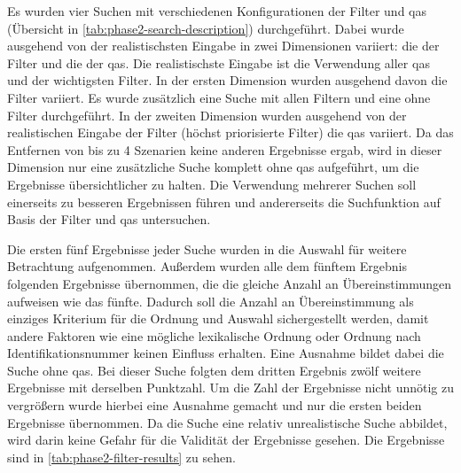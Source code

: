 Es wurden vier Suchen mit verschiedenen Konfigurationen der Filter und \glspl{qa} (Übersicht in \cref{tab:phase2-search-description}) durchgeführt.
Dabei wurde ausgehend von der realistischsten Eingabe in zwei Di\-men\-sio\-nen variiert: die der Filter und die der \glspl{qa}.
Die realistischste Eingabe ist die Verwendung aller \glspl{qa} und der wichtigsten Filter.
In der ersten Dimension wurden ausgehend davon die Filter variiert.
Es wurde zusätzlich eine Suche mit allen Filtern und eine ohne Filter durchgeführt.
In der zweiten Dimension wurden ausgehend von der realistischen Eingabe der Filter (höchst priorisierte Filter) die \glspl{qa} variiert.
Da das Entfernen von bis zu 4 Szenarien keine anderen Ergebnisse ergab, wird in dieser Dimension nur eine zusätzliche Suche komplett ohne \glspl{qa} aufgeführt, um die Ergebnisse übersichtlicher zu halten.
Die Verwendung mehrerer Suchen soll einerseits zu besseren Ergebnissen führen und andererseits die Suchfunktion auf Basis der Filter und \glspl{qa} untersuchen. 



Die ersten fünf Ergebnisse jeder Suche wurden in die Auswahl für weitere Betrachtung aufgenommen.
Außerdem wurden alle dem fünftem Ergebnis folgenden Ergebnisse übernommen, die die gleiche Anzahl an Übereinstimmungen aufweisen wie das fünfte.
Dadurch soll die Anzahl an Übereinstimmung als einziges Kriterium für die Ordnung und Auswahl sichergestellt werden, damit andere Faktoren wie eine mögliche lexikalische Ordnung oder Ordnung nach Identifikationsnummer keinen Einfluss erhalten.
Eine Ausnahme bildet dabei die Suche ohne \glspl{qa}.
Bei dieser Suche folgten dem dritten Ergebnis zwölf weitere Ergebnisse mit derselben Punktzahl.
Um die Zahl der Ergebnisse nicht unnötig zu vergrößern wurde hierbei eine Ausnahme gemacht und nur die ersten beiden Ergebnisse übernommen.
Da die Suche eine relativ unrealistische Suche abbildet, wird darin keine Gefahr für die Validität der Ergebnisse gesehen.
Die Ergebnisse sind in \cref{tab:phase2-filter-results} zu sehen.



